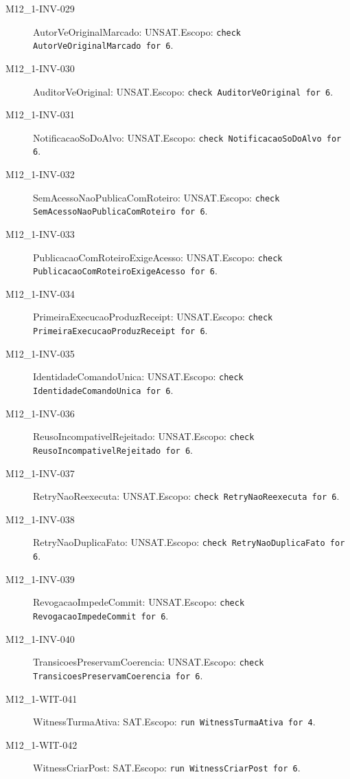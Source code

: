 \begin{description}
\item[M12\_1-INV-029] AutorVeOriginalMarcado: UNSAT.\newline Escopo: \texttt{check AutorVeOriginalMarcado for 6}.
\item[M12\_1-INV-030] AuditorVeOriginal: UNSAT.\newline Escopo: \texttt{check AuditorVeOriginal for 6}.
\item[M12\_1-INV-031] NotificacaoSoDoAlvo: UNSAT.\newline Escopo: \texttt{check NotificacaoSoDoAlvo for 6}.
\item[M12\_1-INV-032] SemAcessoNaoPublicaComRoteiro: UNSAT.\newline Escopo: \texttt{check SemAcessoNaoPublicaComRoteiro for 6}.
\item[M12\_1-INV-033] PublicacaoComRoteiroExigeAcesso: UNSAT.\newline Escopo: \texttt{check PublicacaoComRoteiroExigeAcesso for 6}.
\item[M12\_1-INV-034] PrimeiraExecucaoProduzReceipt: UNSAT.\newline Escopo: \texttt{check PrimeiraExecucaoProduzReceipt for 6}.
\item[M12\_1-INV-035] IdentidadeComandoUnica: UNSAT.\newline Escopo: \texttt{check IdentidadeComandoUnica for 6}.
\item[M12\_1-INV-036] ReusoIncompativelRejeitado: UNSAT.\newline Escopo: \texttt{check ReusoIncompativelRejeitado for 6}.
\item[M12\_1-INV-037] RetryNaoReexecuta: UNSAT.\newline Escopo: \texttt{check RetryNaoReexecuta for 6}.
\item[M12\_1-INV-038] RetryNaoDuplicaFato: UNSAT.\newline Escopo: \texttt{check RetryNaoDuplicaFato for 6}.
\item[M12\_1-INV-039] RevogacaoImpedeCommit: UNSAT.\newline Escopo: \texttt{check RevogacaoImpedeCommit for 6}.
\item[M12\_1-INV-040] TransicoesPreservamCoerencia: UNSAT.\newline Escopo: \texttt{check TransicoesPreservamCoerencia for 6}.
\item[M12\_1-WIT-041] WitnessTurmaAtiva: SAT.\newline Escopo: \texttt{run WitnessTurmaAtiva for 4}.
\item[M12\_1-WIT-042] WitnessCriarPost: SAT.\newline Escopo: \texttt{run WitnessCriarPost for 6}.

\end{description}
